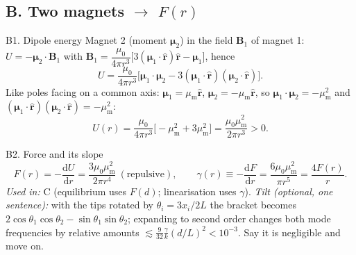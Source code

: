 \documentclass[11pt,a4paper]{article}
\newcommand{\muz}{\mu_0}\newcommand{\mum}{\mu_{\mathrm m}}\newcommand{\dd}{\mathrm{d}}\newcommand{\un}[1]{\,\mathrm{#1}}\newcommand{\Lag}{\mathcal L}
\begin{document}
\subsection*{B. Two magnets $\to$ $F(r)$}
\begin{stepbox}{B1. Dipole energy}
Magnet 2 (moment $\bm\mu_2$) in the field $\bm B_1$ of magnet 1: $U=-\bm\mu_2\cdot\bm B_1$ with $\bm B_1=\dfrac{\muz}{4\pi r^3}\bigl[3(\bm\mu_1\!\cdot\!\hat{\bm r})\hat{\bm r}-\bm\mu_1\bigr]$, hence
\[ U=\frac{\muz}{4\pi r^3}\bigl[\bm\mu_1\!\cdot\!\bm\mu_2-3(\bm\mu_1\!\cdot\!\hat{\bm r})(\bm\mu_2\!\cdot\!\hat{\bm r})\bigr]. \]
Like poles facing on a common axis: $\bm\mu_1=\mum\hat{\bm r}$, $\bm\mu_2=-\mum\hat{\bm r}$, so $\bm\mu_1\!\cdot\!\bm\mu_2=-\mum^2$ and $(\bm\mu_1\!\cdot\!\hat{\bm r})(\bm\mu_2\!\cdot\!\hat{\bm r})=-\mum^2$:
\[ U(r)=\frac{\muz}{4\pi r^3}\bigl[-\mum^2+3\mum^2\bigr]=\frac{\muz\mum^2}{2\pi r^3}>0 . \]
\end{stepbox}
\begin{stepbox}{B2. Force and its slope}
\[ F(r)=-\frac{\dd U}{\dd r}=\frac{3\muz\mum^2}{2\pi r^4}\ (\text{repulsive}),\qquad \gamma(r)\equiv-\frac{\dd F}{\dd r}=\frac{6\muz\mum^2}{\pi r^5}=\frac{4F(r)}{r}. \]
\textit{Used in:} C (equilibrium uses $F(d)$; linearisation uses $\gamma$). \textit{Tilt (optional, one sentence):} with the tips rotated by $\theta_i=3x_i/2L$ the bracket becomes $2\cos\theta_1\cos\theta_2-\sin\theta_1\sin\theta_2$; expanding to second order changes both mode frequencies by relative amounts $\lesssim\tfrac{9}{32}\frac{\gamma}{k}(d/L)^2<10^{-3}$. Say it is negligible and move on.
\end{stepbox}
\end{document}
